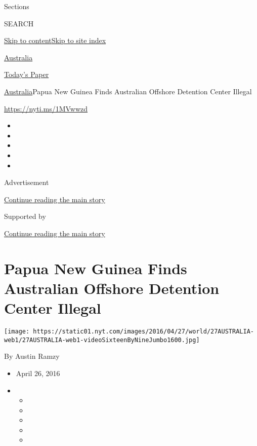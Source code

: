 Sections

SEARCH

\protect\hyperlink{site-content}{Skip to
content}\protect\hyperlink{site-index}{Skip to site index}

\href{https://www.nytimes.com/section/world/australia}{Australia}

\href{https://myaccount.nytimes.com/auth/login?response_type=cookie\&client_id=vi}{}

\href{https://www.nytimes.com/section/todayspaper}{Today's Paper}

\href{/section/world/australia}{Australia}\textbar{}Papua New Guinea
Finds Australian Offshore Detention Center Illegal

\url{https://nyti.ms/1MVwwzd}

\begin{itemize}
\item
\item
\item
\item
\item
\end{itemize}

Advertisement

\protect\hyperlink{after-top}{Continue reading the main story}

Supported by

\protect\hyperlink{after-sponsor}{Continue reading the main story}

\hypertarget{papua-new-guinea-finds-australian-offshore-detention-center-illegal}{%
\section{Papua New Guinea Finds Australian Offshore Detention Center
Illegal}\label{papua-new-guinea-finds-australian-offshore-detention-center-illegal}}

\texttt{[image: https://static01.nyt.com/images/2016/04/27/world/27AUSTRALIA-web1/27AUSTRALIA-web1-videoSixteenByNineJumbo1600.jpg]}

By Austin Ramzy

\begin{itemize}
\item
  April 26, 2016
\item
  \begin{itemize}
  \item
  \item
  \item
  \item
  \item
  \end{itemize}
\end{itemize}

